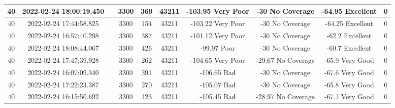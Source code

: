 \begin{longtable*}{|c|c|c|c|c|c|c|c|c|c|}
40&2022-02-24 18:00:19.450&&3300&369&43211& -103.95   Very Poor   & -30       No Coverage & -64.95    Excellent   & 0\\\hline
{}40&2022-02-24 17:44:58.825&&3300&154&43211& -103.22   Very Poor   & -30       No Coverage & -64.25    Excellent   & 0\\\hline
{}40&2022-02-24 16:57:40.298&&3300&387&43211& -101.12   Very Poor   & -30       No Coverage & -62.2     Excellent   & 0\\\hline
{}40&2022-02-24 18:08:44.067&&3300&426&43211& -99.97    Poor        & -30       No Coverage & -60.7     Excellent   & 0\\\hline
{}40&2022-02-24 17:47:39.928&&3300&262&43211& -104.65   Very Poor   & -29.67    No Coverage & -65.9     Very Good   & 0\\\hline
{}40&2022-02-24 16:07:09.340&&3300&391&43211& -106.65   Bad         & -30       No Coverage & -67.6     Very Good   & 0\\\hline
{}40&2022-02-24 17:22:23.387&&3300&270&43211& -105.07   Bad         & -30       No Coverage & -65.8     Very Good   & 0\\\hline
{}40&2022-02-24 16:15:50.692&&3300&123&43211& -105.45   Bad         & -28.97    No Coverage & -67.1     Very Good   & 0\\\hline

\end{longtable*}
